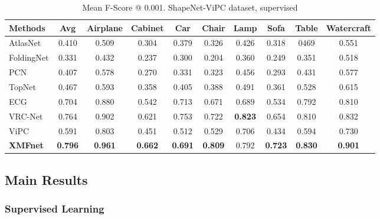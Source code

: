 \documentclass{article}
\begin{document}
\begin{table}
  \caption{Mean F-Score @ 0.001. ShapeNet-ViPC dataset, supervised}
  \setlength\tabcolsep{4.4pt}
  \label{f-score}
  \centering
  \begin{tabular}{lccccccccc}
\cmidrule(r){1-10}
    Methods & Avg & Airplane & Cabinet & Car & Chair & Lamp & Sofa & Table & Watercraft \\
    \midrule
    \midrule
    AtlasNet \cite{atlas} & 0.410 & 0.509 & 0.304 & 0.379 & 0.326 & 0.426 & 0.318 & 0469 & 0.551      \\
    FoldingNet \cite{folding}  &  0.331  & 0.432 & 0.237 & 0.300 & 0.204 & 0.360 & 0.249 & 0.351 & 0.518 \\
    PCN \cite{pcn}& 0.407 & 0.578 & 0.270 & 0.331 & 0.323 & 0.456 & 0.293 & 0.431 & 0.577\\  
    TopNet \cite{topnet}  & 0.467 & 0.593 & 0.358 & 0.405 & 0.388 & 0.491 & 0.361 & 0.528 & 0.615\\
    ECG \cite{ecg} & 0.704 & 0.880 & 0.542 & 0.713 & 0.671 & 0.689 & 0.534 & 0.792 & 0.810\\ 
    VRC-Net \cite{vrc} & 0.764 & 0.902 & 0.621 & 0.753 & 0.722 & \textbf{0.823} & 0.654 & 0.810 & 0.832\\
    ViPC \cite{vipc} & 0.591 & 0.803 & 0.451 & 0.512 & 0.529 & 0.706 & 0.434 & 0.594 & 0.730\\
    \textbf{XMFnet} & \textbf{0.796}  & \textbf{0.961} & \textbf{0.662} & \textbf{0.691} & \textbf{0.809} & 0.792 &\textbf{0.723} & \textbf{0.830} & \textbf{0.901}  \\
    \bottomrule
  \end{tabular}
\end{table}

\subsection{Main Results}


\subsubsection{Supervised Learning}
\end{document}
